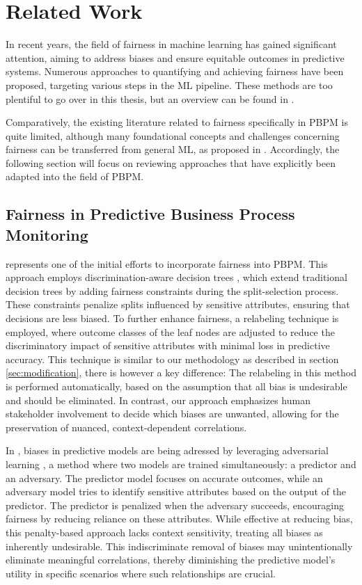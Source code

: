 \chapter{Related Work}
In recent years, the field of fairness in machine learning has gained significant attention,
aiming to address biases and ensure equitable outcomes in predictive systems.
Numerous approaches to quantifying and achieving fairness have been proposed,
targeting various steps in the ML pipeline.
These methods are too plentiful to go over in this thesis,
but an overview can be found in \cite{fairness_ml}.

Comparatively, the existing literature related to fairness specifically in PBPM is quite limited,
although many foundational concepts and challenges concerning fairness can be transferred
from general ML, as proposed in \cite{fairness_overview}.
Accordingly, the following section will focus on reviewing approaches
that have explicitly been adapted into the field of PBPM.

\section{Fairness in Predictive Business Process Monitoring}
\cite{fairness_foundation} represents one of the initial efforts to incorporate fairness into PBPM.
This approach employs discrimination-aware decision trees \cite{fairness_decision_tree},
which extend traditional decision trees by adding fairness constraints during the split-selection process.
These constraints penalize splits influenced by sensitive attributes,
ensuring that decisions are less biased. 
To further enhance fairness,
a relabeling technique is employed, where outcome classes of the leaf nodes are adjusted
to reduce the discriminatory impact of sensitive attributes with minimal loss in predictive accuracy.
This technique is similar to our methodology as described in section \ref{sec:modification},
there is however a key difference:
The relabeling in this method is performed automatically,
based on the assumption that all bias is undesirable and should be eliminated.
In contrast, our approach emphasizes human stakeholder involvement to decide which biases are unwanted,
allowing for the preservation of nuanced, context-dependent correlations.

In \cite{fairness_adversarial},
biases in predictive models are being adressed by leveraging adversarial learning \cite{gan},
a method where two models are trained simultaneously: a predictor and an adversary.
The predictor model focuses on accurate outcomes,
while an adversary model tries to identify sensitive attributes based on the output of the predictor.
The predictor is penalized when the adversary succeeds,
encouraging fairness by reducing reliance on these attributes.
While effective at reducing bias,
this penalty-based approach lacks context sensitivity,
treating all biases as inherently undesirable.
This indiscriminate removal of biases may unintentionally eliminate meaningful correlations,
thereby diminishing the predictive model's utility in specific scenarios
where such relationships are crucial.

